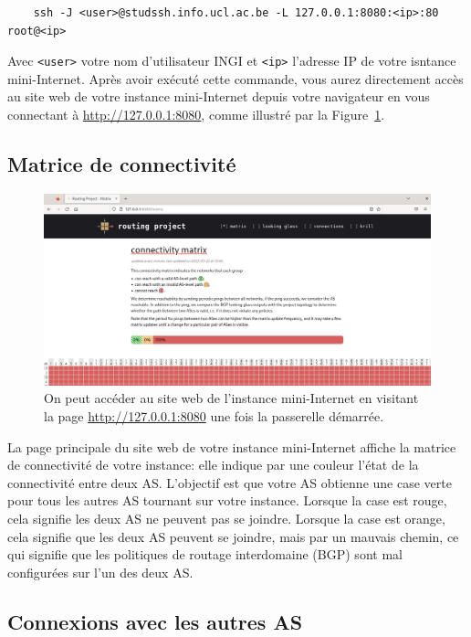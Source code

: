 \documentclass[a4paper, 11pt]{article}
\begin{document}
\begin{verbatim}
    ssh -J <user>@studssh.info.ucl.ac.be -L 127.0.0.1:8080:<ip>:80 root@<ip>
\end{verbatim}
Avec \texttt{<user>} votre nom d'utilisateur INGI et \texttt{<ip>} l'adresse IP
de votre isntance mini-Internet.
Après avoir exécuté cette commande, vous aurez directement accès au site web
de votre instance mini-Internet depuis votre navigateur en vous connectant
à \url{http://127.0.0.1:8080}, comme illustré par la
Figure~\ref{fig:website-screenshot}.

\subsection{Matrice de connectivité}

\begin{figure}
    \centering
    \includegraphics[width=0.8\linewidth]{figures/website-screenshot.png}
    \caption{On peut accéder au site web de l'instance mini-Internet
            en visitant la page \url{http://127.0.0.1:8080}
            une fois la passerelle démarrée.}
    \label{fig:website-screenshot}
\end{figure}

La page principale du site web de votre instance mini-Internet affiche la
matrice de connectivité de votre instance: elle indique par une couleur
l'état de la connectivité entre deux AS. L'objectif est que votre AS
obtienne une case verte pour tous les autres AS tournant sur votre instance.
Lorsque la case est rouge, cela signifie les deux AS ne peuvent pas se joindre.
Lorsque la case est orange, cela signifie que les deux AS peuvent se joindre,
mais par un mauvais chemin, ce qui signifie que les politiques de routage
interdomaine (BGP) sont mal configurées sur l'un des deux AS.


\subsection{Connexions avec les autres AS}
\end{document}
